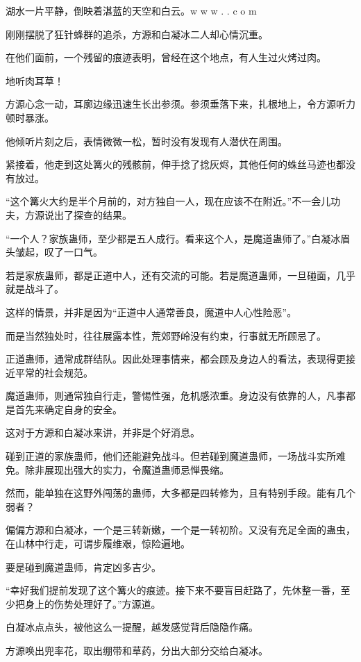 
\begin{this_body}

湖水一片平静，倒映着湛蓝的天空和白云。w w w .  . c o m

刚刚摆脱了狂针蜂群的追杀，方源和白凝冰二人却心情沉重。

在他们面前，一个残留的痕迹表明，曾经在这个地点，有人生过火烤过肉。

地听肉耳草！

方源心念一动，耳廓边缘迅速生长出参须。参须垂落下来，扎根地上，令方源听力顿时暴涨。

他倾听片刻之后，表情微微一松，暂时没有发现有人潜伏在周围。

紧接着，他走到这处篝火的残骸前，伸手捻了捻灰烬，其他任何的蛛丝马迹也都没有放过。

“这个篝火大约是半个月前的，对方独自一人，现在应该不在附近。”不一会儿功夫，方源说出了探查的结果。

“一个人？家族蛊师，至少都是五人成行。看来这个人，是魔道蛊师了。”白凝冰眉头皱起，叹了一口气。

若是家族蛊师，都是正道中人，还有交流的可能。若是魔道蛊师，一旦碰面，几乎就是战斗了。

这样的情景，并非是因为“正道中人通常善良，魔道中人心性险恶”。

而是当然独处时，往往展露本性，荒郊野岭没有约束，行事就无所顾忌了。

正道蛊师，通常成群结队。因此处理事情来，都会顾及身边人的看法，表现得更接近平常的社会规范。

魔道蛊师，则通常独自行走，警惕性强，危机感浓重。身边没有依靠的人，凡事都是首先来确定自身的安全。

这对于方源和白凝冰来讲，并非是个好消息。

碰到正道的家族蛊师，他们还能避免战斗。但若碰到魔道蛊师，一场战斗实所难免。除非展现出强大的实力，令魔道蛊师忌惮畏缩。

然而，能单独在这野外闯荡的蛊师，大多都是四转修为，且有特别手段。能有几个弱者？

偏偏方源和白凝冰，一个是三转新嫩，一个是一转初阶。又没有充足全面的蛊虫，在山林中行走，可谓步履维艰，惊险遍地。

要是碰到魔道蛊师，肯定凶多吉少。

“幸好我们提前发现了这个篝火的痕迹。接下来不要盲目赶路了，先休整一番，至少把身上的伤势处理好了。”方源道。

白凝冰点点头，被他这么一提醒，越发感觉背后隐隐作痛。

方源唤出兜率花，取出绷带和草药，分出大部分交给白凝冰。


\end{this_body}
